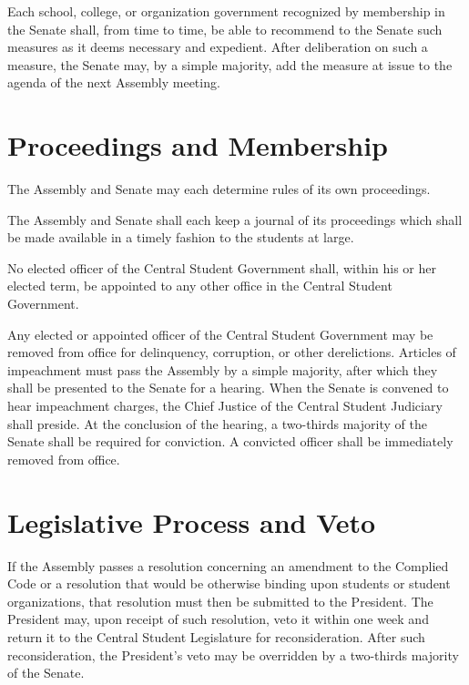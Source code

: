     Each school, college, or organization government recognized by membership in the Senate shall, from time to time, be able to recommend to the Senate such measures as it deems necessary and expedient. After deliberation on such a measure, the Senate may, by a simple majority, add the measure at issue to the agenda of the next Assembly meeting.

\section{Proceedings and Membership}
    The Assembly and Senate may each determine rules of its own proceedings.

    The Assembly and Senate shall each keep a journal of its proceedings which shall be made available in a timely fashion to the students at large.

    No elected officer of the Central Student Government shall, within his or her elected term, be appointed to any other office in the Central Student Government.

    Any elected or appointed officer of the Central Student Government may be removed from office for delinquency, corruption, or other derelictions. Articles of impeachment must pass the Assembly by a simple majority, after which they shall be presented to the Senate for a hearing. When the Senate is convened to hear impeachment charges, the Chief Justice of the Central Student Judiciary shall preside. At the conclusion of the hearing, a two-thirds majority of the Senate shall be required for conviction. A convicted officer shall be immediately removed from office.

\section{Legislative Process and Veto}
    If the Assembly passes a resolution concerning an amendment to the Complied Code or a resolution that would be otherwise binding upon students or student organizations, that resolution must then be submitted to the President. The President may, upon receipt of such resolution, veto it within one week and return it to the Central Student Legislature for reconsideration. After such reconsideration, the President's veto may be overridden by a  two-thirds majority of the Senate.
